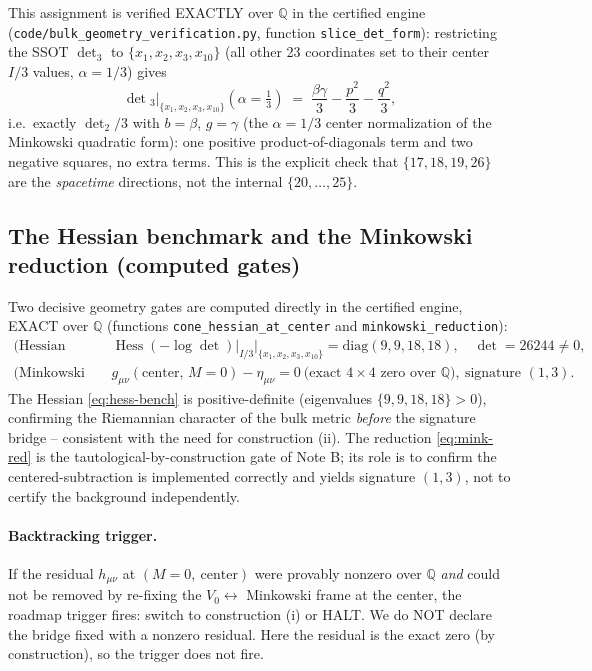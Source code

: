 This assignment is verified EXACTLY over $\mathbb{Q}$ in the certified engine
(\texttt{code/bulk\_geometry\_verification.py}, function \texttt{slice\_det\_form}):
restricting the SSOT $\det_3$ to $\{x_1,x_2,x_3,x_{10}\}$ (all other 23 coordinates
set to their center $I/3$ values, $\alpha = 1/3$) gives
\begin{equation}
  \det{}_3\big|_{\{x_1,x_2,x_3,x_{10}\}}(\alpha = \tfrac13)
    \;=\; \frac{\beta\gamma}{3} - \frac{p^2}{3} - \frac{q^2}{3},
  \label{eq:slice-det-form}
\end{equation}
i.e.\ exactly $\det_2/3$ with $b=\beta$, $g=\gamma$ (the $\alpha = 1/3$ center
normalization of the Minkowski quadratic form): one positive product-of-diagonals
term and two negative squares, no extra terms. This is the explicit check that
$\{17,18,19,26\}$ are the \emph{spacetime} directions, not the internal
$\{20,\dots,25\}$.

\subsection{The Hessian benchmark and the Minkowski reduction (computed gates)}
\label{sec:gates}

Two decisive geometry gates are computed directly in the certified engine, EXACT
over $\mathbb{Q}$ (functions \texttt{cone\_hessian\_at\_center} and
\texttt{minkowski\_reduction}):
\begin{align}
  \text{(Hessian benchmark)}\quad
    &\operatorname{Hess}(-\log\det)\big|_{I/3}\Big|_{\{x_1,x_2,x_3,x_{10}\}}
    = \mathrm{diag}(9,9,18,18), \quad \det = 26244 \neq 0,
    \label{eq:hess-bench}\\[2pt]
  \text{(Minkowski reduction)}\quad
    &g_{\mu\nu}(\text{center},\,M{=}0) - \eta_{\mu\nu} = 0
    \ \text{(exact $4\times4$ zero over $\mathbb{Q}$)},\ \text{signature }(1,3).
    \label{eq:mink-red}
\end{align}
The Hessian \eqref{eq:hess-bench} is positive-definite (eigenvalues
$\{9,9,18,18\} > 0$), confirming the Riemannian character of the bulk metric
\emph{before} the signature bridge -- consistent with the need for construction
(ii). The reduction \eqref{eq:mink-red} is the tautological-by-construction gate
of Note B; its role is to confirm the centered-subtraction is implemented
correctly and yields signature $(1,3)$, not to certify the background
independently.

\paragraph{Backtracking trigger.}
If the residual $h_{\mu\nu}$ at $(M=0,\ \text{center})$ were provably nonzero over
$\mathbb{Q}$ \emph{and} could not be removed by re-fixing the $V_0 \leftrightarrow$
Minkowski frame at the center, the roadmap trigger fires: switch to construction
(i) or HALT. We do NOT declare the bridge fixed with a nonzero residual. Here the
residual is the exact zero (by construction), so the trigger does not fire.

